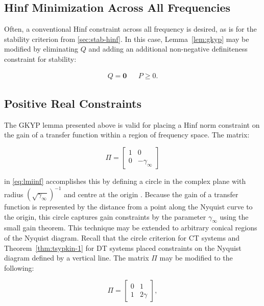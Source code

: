 \subsection{\gls{Hinf} Minimization Across All Frequencies}
\label{sec:opt-hinf}

Often, a conventional \gls{Hinf} constraint across all frequency is desired, as is for the stability criterion from \autoref{sec:stab-hinf}. In this case, Lemma~\ref{lem:gkyp} may be modified by eliminating $Q$ and adding an additional non-negative definiteness constraint for stability:

\begin{align} \label{eq:gkyp-ifi}
	Q = \mathbf{0} &&
	P \geq 0.
\end{align}

\subsection{Positive Real Constraints}
\label{sec:opt-spr}

The \gls{GKYP} lemma presented above is valid for placing a \gls{Hinf} norm constraint on the gain of a transfer function within a region of frequency space. The matrix:

\begin{equation}
	\Pi = 
	\begin{bmatrix}
		1 & 0 \\
		0 & -\gamma_\infty
	\end{bmatrix} \label{eq:gkyp-sg}
\end{equation}

in \autoref{eq:lmiinf} accomplishes this by defining a circle in the complex plane with radius $\left(\sqrt{\gamma_\infty}\right)^{-1}$ and centre at the origin \cite[Lem. 1]{Iwasaki2003a}. Because the gain of a transfer function is represented by the distance from a point along the Nyquist curve to the origin, this circle captures gain constraints by the parameter $\gamma_\infty$ using the small gain theorem. This technique may be extended to arbitrary conical regions of the Nyquist diagram. Recall that the circle criterion for \gls{CT} systems and Theorem~\ref{thm:tsypkin-1} for \gls{DT} systems placed constraints on the Nyquist diagram defined by a vertical line. The matrix $\Pi$ may be modified to the following:

\begin{equation}
	\Pi = 
	\begin{bmatrix}
		0 & 1 \\
		1 & 2\gamma
	\end{bmatrix},
\end{equation}

